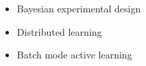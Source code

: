 \begin{itemize}
\item Bayesian experimental design
\item Distributed learning
\item Batch mode active learning
\end{itemize}

%
%
%
%
%
